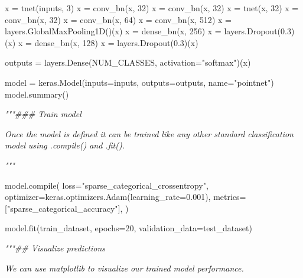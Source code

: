 \documentclass[
  12pt,
  a4paper,
]{article}
\newenvironment{Shaded}{}{}
\newcommand{\BuiltInTok}[1]{#1}
\newcommand{\CommentTok}[1]{\textcolor[rgb]{0.38,0.63,0.69}{\textit{#1}}}
\newcommand{\DecValTok}[1]{\textcolor[rgb]{0.25,0.63,0.44}{#1}}
\newcommand{\FloatTok}[1]{\textcolor[rgb]{0.25,0.63,0.44}{#1}}
\newcommand{\NormalTok}[1]{#1}
\newcommand{\OperatorTok}[1]{\textcolor[rgb]{0.40,0.40,0.40}{#1}}
\newcommand{\StringTok}[1]{\textcolor[rgb]{0.25,0.44,0.63}{#1}}
\begin{document}
\begin{Shaded}
\begin{Highlighting}[]
\NormalTok{x }\OperatorTok{=}\NormalTok{ tnet(inputs, }\DecValTok{3}\NormalTok{)}
\NormalTok{x }\OperatorTok{=}\NormalTok{ conv\_bn(x, }\DecValTok{32}\NormalTok{)}
\NormalTok{x }\OperatorTok{=}\NormalTok{ conv\_bn(x, }\DecValTok{32}\NormalTok{)}
\NormalTok{x }\OperatorTok{=}\NormalTok{ tnet(x, }\DecValTok{32}\NormalTok{)}
\NormalTok{x }\OperatorTok{=}\NormalTok{ conv\_bn(x, }\DecValTok{32}\NormalTok{)}
\NormalTok{x }\OperatorTok{=}\NormalTok{ conv\_bn(x, }\DecValTok{64}\NormalTok{)}
\NormalTok{x }\OperatorTok{=}\NormalTok{ conv\_bn(x, }\DecValTok{512}\NormalTok{)}
\NormalTok{x }\OperatorTok{=}\NormalTok{ layers.GlobalMaxPooling1D()(x)}
\NormalTok{x }\OperatorTok{=}\NormalTok{ dense\_bn(x, }\DecValTok{256}\NormalTok{)}
\NormalTok{x }\OperatorTok{=}\NormalTok{ layers.Dropout(}\FloatTok{0.3}\NormalTok{)(x)}
\NormalTok{x }\OperatorTok{=}\NormalTok{ dense\_bn(x, }\DecValTok{128}\NormalTok{)}
\NormalTok{x }\OperatorTok{=}\NormalTok{ layers.Dropout(}\FloatTok{0.3}\NormalTok{)(x)}

\NormalTok{outputs }\OperatorTok{=}\NormalTok{ layers.Dense(NUM\_CLASSES, activation}\OperatorTok{=}\StringTok{"softmax"}\NormalTok{)(x)}

\NormalTok{model }\OperatorTok{=}\NormalTok{ keras.Model(inputs}\OperatorTok{=}\NormalTok{inputs, outputs}\OperatorTok{=}\NormalTok{outputs, name}\OperatorTok{=}\StringTok{"pointnet"}\NormalTok{)}
\NormalTok{model.summary()}

\CommentTok{"""\#\#\# Train model}

\CommentTok{Once the model is defined it can be trained like any other standard classification model}
\CommentTok{using \textasciigrave{}.compile()\textasciigrave{} and \textasciigrave{}.fit()\textasciigrave{}.}

\CommentTok{"""}

\NormalTok{model.}\BuiltInTok{compile}\NormalTok{(}
\NormalTok{    loss}\OperatorTok{=}\StringTok{"sparse\_categorical\_crossentropy"}\NormalTok{,}
\NormalTok{    optimizer}\OperatorTok{=}\NormalTok{keras.optimizers.Adam(learning\_rate}\OperatorTok{=}\FloatTok{0.001}\NormalTok{),}
\NormalTok{    metrics}\OperatorTok{=}\NormalTok{[}\StringTok{"sparse\_categorical\_accuracy"}\NormalTok{],}
\NormalTok{)}

\NormalTok{model.fit(train\_dataset, epochs}\OperatorTok{=}\DecValTok{20}\NormalTok{, validation\_data}\OperatorTok{=}\NormalTok{test\_dataset)}

\CommentTok{"""\#\# Visualize predictions}

\CommentTok{We can use matplotlib to visualize our trained model performance.}


\end{Highlighting}
\end{Shaded}
\end{document}

